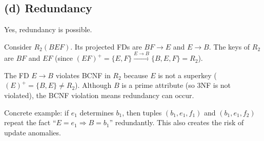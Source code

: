 \documentclass[11pt]{article}
\begin{document}
\subsection*{(d) Redundancy}

Yes, redundancy is possible.

Consider $R_2(BEF)$. Its projected FDs are $BF \to E$ and $E \to B$.
The keys of $R_2$ are $BF$ and $EF$ (since $(EF)^+ = \{E,F\}
\xrightarrow{E \to B} \{B,E,F\} = R_2$).

The FD $E \to B$ violates BCNF in $R_2$ because $E$ is not a superkey
($(E)^+ = \{B,E\} \neq R_2$). Although $B$ is a prime attribute
(so 3NF is not violated), the BCNF violation means redundancy can occur.

Concrete example: if $e_1$ determines $b_1$, then tuples
$(b_1, e_1, f_1)$ and $(b_1, e_1, f_2)$ repeat the fact
``$E = e_1 \Rightarrow B = b_1$'' redundantly.
This also creates the risk of update anomalies.
\end{document}
